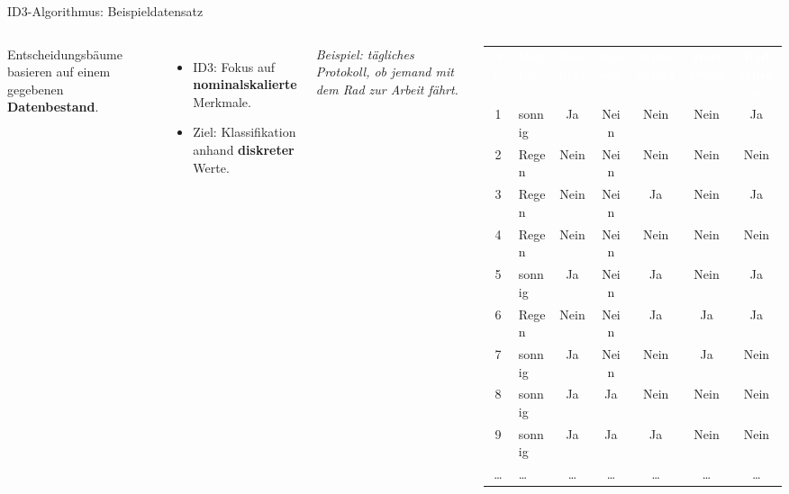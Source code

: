 \begin{frame}{ID3-Algorithmus: Beispieldatensatz}
\begin{columns}
    \footnotesize
{}
Entscheidungsbäume basieren auf einem gegebenen \textbf{Datenbestand}.

\begin{itemize}
  \item ID3: Fokus auf \textbf{nominalskalierte} Merkmale.
  \item Ziel: Klassifikation anhand \textbf{diskreter} Werte.
\end{itemize}

\vspace{0.4em}
{\footnotesize\itshape Beispiel: tägliches Protokoll, ob jemand mit dem Rad
zur Arbeit fährt.}

\centering
{\scriptsize
\renewcommand{\arraystretch}{1.3}
\setlength{\tabcolsep}{4pt}
\begin{tabular}{c l c c c c c}
\rowcolor{PrimaryColor}
\textcolor{white}{\textbf{Nr.}} &
\textcolor{white}{\textbf{Wetter}} &
\textcolor{white}{\textbf{Sonnig?}} &
\textcolor{white}{\textbf{Schnee}} &
\textcolor{white}{\textbf{Auto defekt}} &
\textcolor{white}{\textbf{Start 08:00}} &
\textcolor{white}{\textbf{Rad fahren}}\\
1 & sonnig & Ja   & Nein & Nein & Nein & Ja\\
2 & Regen  & Nein & Nein & Nein & Nein & Nein\\
3 & Regen  & Nein & Nein & Ja   & Nein & Ja\\
4 & Regen  & Nein & Nein & Nein & Nein & Nein\\
5 & sonnig & Ja   & Nein & Ja   & Nein & Ja\\
6 & Regen  & Nein & Nein & Ja   & Ja   & Ja\\
7 & sonnig & Ja   & Nein & Nein & Ja   & Nein\\
8 & sonnig & Ja   & Ja   & Nein & Nein & Nein\\
9 & sonnig & Ja   & Ja   & Ja   & Nein & Nein\\
\dots & \dots & \dots & \dots & \dots & \dots & \dots\\
\end{tabular}}
\end{columns}
\end{frame}

